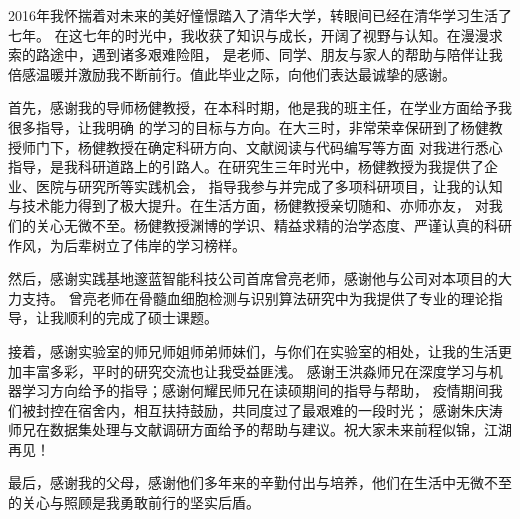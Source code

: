 
\begin{acknowledgements}
2016年我怀揣着对未来的美好憧憬踏入了清华大学，转眼间已经在清华学习生活了七年。
在这七年的时光中，我收获了知识与成长，开阔了视野与认知。在漫漫求索的路途中，遇到诸多艰难险阻，
是老师、同学、朋友与家人的帮助与陪伴让我倍感温暖并激励我不断前行。值此毕业之际，向他们表达最诚挚的感谢。

首先，感谢我的导师杨健教授，在本科时期，他是我的班主任，在学业方面给予我很多指导，让我明确
的学习的目标与方向。在大三时，非常荣幸保研到了杨健教授师门下，杨健教授在确定科研方向、文献阅读与代码编写等方面
对我进行悉心指导，是我科研道路上的引路人。在研究生三年时光中，杨健教授为我提供了企业、医院与研究所等实践机会，
指导我参与并完成了多项科研项目，让我的认知与技术能力得到了极大提升。在生活方面，杨健教授亲切随和、亦师亦友，
对我们的关心无微不至。杨健教授渊博的学识、精益求精的治学态度、严谨认真的科研作风，为后辈树立了伟岸的学习榜样。

然后，感谢实践基地邃蓝智能科技公司首席曾亮老师，感谢他与公司对本项目的大力支持。
曾亮老师在骨髓血细胞检测与识别算法研究中为我提供了专业的理论指导，让我顺利的完成了硕士课题。

接着，感谢实验室的师兄师姐师弟师妹们，与你们在实验室的相处，让我的生活更加丰富多彩，平时的研究交流也让我受益匪浅。
感谢王洪淼师兄在深度学习与机器学习方向给予的指导；感谢何耀民师兄在读硕期间的指导与帮助，
疫情期间我们被封控在宿舍内，相互扶持鼓励，共同度过了最艰难的一段时光；
感谢朱庆涛师兄在数据集处理与文献调研方面给予的帮助与建议。祝大家未来前程似锦，江湖再见！

最后，感谢我的父母，感谢他们多年来的辛勤付出与培养，他们在生活中无微不至的关心与照顾是我勇敢前行的坚实后盾。

\end{acknowledgements}
